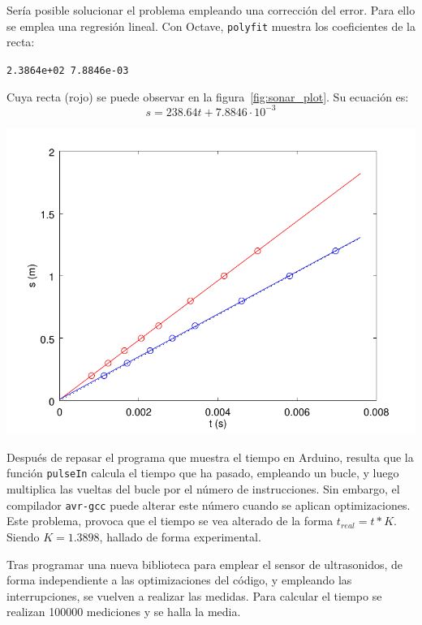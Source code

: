 \documentclass[10pt,a4paper,hidelinks]{article}
\begin{document}
\begin{multicols}{2}
Sería posible solucionar el problema empleando una corrección del error. Para 
ello se emplea una regresión lineal. Con Octave, \texttt{polyfit} muestra los 
coeficientes de la recta:
\begin{center}
\texttt{2.3864e+02   7.8846e-03}
\end{center}
Cuya recta (rojo) se puede observar en la figura~\ref{fig:sonar_plot}. Su 
ecuación es:
$$s = 238.64t + 7.8846\cdot10^{-3}$$
\begin{center}
	\includegraphics[scale=0.6]{sonar.pdf}
\end{center}

Después de repasar el programa que muestra el tiempo en Arduino, resulta que la 
función \texttt{pulseIn} calcula el tiempo que ha pasado, empleando un bucle, y 
luego multiplica las vueltas del bucle por el número de instrucciones. Sin 
embargo, el compilador \texttt{avr-gcc} puede alterar este número cuando se 
aplican optimizaciones. Este problema, provoca que el tiempo se vea alterado de 
la forma $ t_{real} = t * K $. Siendo $ K = 1.3898 $, hallado de forma 
experimental.

Tras programar una nueva biblioteca para emplear el sensor de ultrasonidos, de 
forma independiente a las optimizaciones del código, y empleando las 
interrupciones, se vuelven a realizar las medidas. Para calcular el tiempo se 
realizan 100000 mediciones y se halla la media.


\end{multicols}
\end{document}
